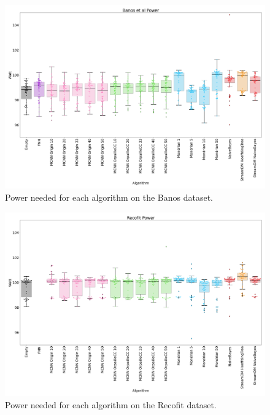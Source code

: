 \begin{figure}[H]
	\includegraphics[width=\linewidth]{figures/results/banos_watt.png}
	\caption{Power needed for each algorithm on the Banos dataset.}
	\label{fig:power}
\end{figure}
\begin{figure}[H]
	\includegraphics[width=\linewidth]{figures/results/recofit_watt.png}
	\caption{Power needed for each algorithm on the Recofit dataset.}
\end{figure}
